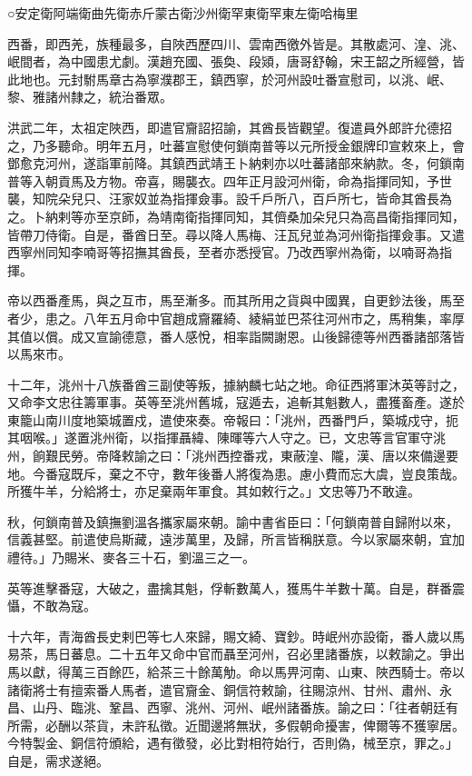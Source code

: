
\begin{pinyinscope}
○安定衛阿端衛曲先衛赤斤蒙古衛沙州衛罕東衛罕東左衛哈梅里

西番，即西羌，族種最多，自陜西歷四川、雲南西徼外皆是。其散處河、湟、洮、岷間者，為中國患尤劇。漢趙充國、張奐、段熲，唐哥舒翰，宋王韶之所經營，皆此地也。元封駙馬章古為寧濮郡王，鎮西寧，於河州設吐番宣慰司，以洮、岷、黎、雅諸州隸之，統治番眾。

洪武二年，太祖定陜西，即遣官齎詔招諭，其酋長皆觀望。復遣員外郎許允德招之，乃多聽命。明年五月，吐蕃宣慰使何鎖南普等以元所授金銀牌印宣敕來上，會鄧愈克河州，遂詣軍前降。其鎮西武靖王卜納剌亦以吐蕃諸部來納款。冬，何鎖南普等入朝貢馬及方物。帝喜，賜襲衣。四年正月設河州衛，命為指揮同知，予世襲，知院朵兒只、汪家奴並為指揮僉事。設千戶所八，百戶所七，皆命其酋長為之。卜納剌等亦至京師，為靖南衛指揮同知，其儕桑加朵兒只為高昌衛指揮同知，皆帶刀侍衛。自是，番酋日至。尋以降人馬梅、汪瓦兒並為河州衛指揮僉事。又遣西寧州同知李喃哥等招撫其酋長，至者亦悉授官。乃改西寧州為衛，以喃哥為指揮。

帝以西番產馬，與之互市，馬至漸多。而其所用之貨與中國異，自更鈔法後，馬至者少，患之。八年五月命中官趙成齎羅綺、綾絹並巴茶往河州市之，馬稍集，率厚其值以償。成又宣諭德意，番人感悅，相率詣闕謝恩。山後歸德等州西番諸部落皆以馬來市。

十二年，洮州十八族番酋三副使等叛，據納麟七站之地。命征西將軍沐英等討之，又命李文忠往籌軍事。英等至洮州舊城，寇遁去，追斬其魁數人，盡獲畜產。遂於東籠山南川度地築城置戍，遣使來奏。帝報曰：「洮州，西番門戶，築城戍守，扼其咽喉。」遂置洮州衛，以指揮聶緯、陳暉等六人守之。已，文忠等言官軍守洮州，餉艱民勞。帝降敕諭之曰：「洮州西控番戎，東蔽湟、隴，漢、唐以來備邊要地。今番寇既斥，棄之不守，數年後番人將復為患。慮小費而忘大虞，豈良策哉。所獲牛羊，分給將士，亦足棄兩年軍食。其如敕行之。」文忠等乃不敢違。

秋，何鎖南普及鎮撫劉溫各攜家屬來朝。諭中書省臣曰：「何鎖南普自歸附以來，信義甚堅。前遣使烏斯藏，遠涉萬里，及歸，所言皆稱朕意。今以家屬來朝，宜加禮待。」乃賜米、麥各三十石，劉溫三之一。

英等進擊番寇，大破之，盡擒其魁，俘斬數萬人，獲馬牛羊數十萬。自是，群番震懾，不敢為寇。

十六年，青海酋長史剌巴等七人來歸，賜文綺、寶鈔。時岷州亦設衛，番人歲以馬易茶，馬日蕃息。二十五年又命中官而聶至河州，召必里諸番族，以敕諭之。爭出馬以獻，得萬三百餘匹，給茶三十餘萬觔。命以馬畀河南、山東、陜西騎士。帝以諸衛將士有擅索番人馬者，遣官齎金、銅信符敕諭，往賜涼州、甘州、肅州、永昌、山丹、臨洮、鞏昌、西寧、洮州、河州、岷州諸番族。諭之曰：「往者朝廷有所需，必酬以茶貨，未許私徵。近聞邊將無狀，多假朝命擾害，俾爾等不獲寧居。今特製金、銅信符頒給，遇有徵發，必比對相符始行，否則偽，械至京，罪之。」自是，需求遂絕。


\end{pinyinscope}

